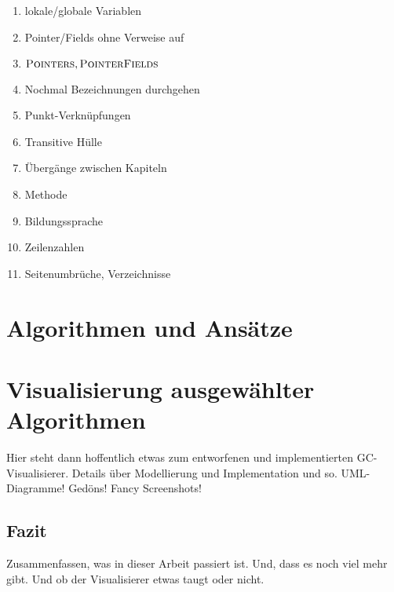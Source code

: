 
\listfiles


\listoftodos

\begin{enumerate}
	\item lokale/globale Variablen
	\item Pointer/Fields ohne Verweise auf \Roots
	\item $\textsc{Pointers}, \textsc{PointerFields}$
	\item Nochmal Bezeichnungen durchgehen
	\item Punkt-Verknüpfungen
	\item Transitive Hülle
	\item Übergänge zwischen Kapiteln
	\item Methode
	\item Bildungssprache
	\item Zeilenzahlen
	\item Seitenumbrüche, Verzeichnisse
\end{enumerate}



\cleardoublepage

\setcounter{page}{1}
\pagestyle{maincontentstyle}


\part{Algorithmen und Ansätze}






\part{Visualisierung ausgewählter Algorithmen}
Hier steht dann hoffentlich etwas zum entworfenen und implementierten GC-Visualisierer. Details über Modellierung und Implementation und so. UML-Diagramme! Gedöns! Fancy Screenshots!
%
\cleardoublepage

\chapter{Fazit}
Zusammenfassen, was in dieser Arbeit passiert ist.
Und, dass es noch viel mehr gibt.
Und ob der Visualisierer etwas taugt oder nicht.




